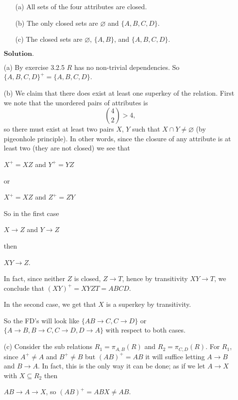 \documentclass{article}
\theoremstyle{remark}
\begin{document}
\begin{enumerate}
    \begin{itemize}
        \item[(a)] All sets of the four attributes are closed.
        \item[(b)] The only closed sets are $\varnothing$ and $\{A,B,C,D\}$.
        \item[(c)] The closed sets are $\varnothing$, $\{A,B\}$, and $\{A,B,C,D\}$. 
    \end{itemize}
    $\textbf{Solution.}$
    \item[(a)] By exercise 3.2.5 $R$ has no non-trivial dependencies. So $\{A,B,C,D\}^+ = \{A,B,C,D\}$.
    \item[(b)] We claim that there does exist at least one superkey of the relation.
    First we note that the unordered pairs of attributes is \[ \binom{4}{2} > 4,\] so there must exist at least two pairs $X$, $Y$ such that $X \cap Y \neq \varnothing$ (by pigeonhole principle).
    In other words, since the closure of any attribute is at least two (they are not closed) we see that  
    \begin{center}
        $X^+ = XZ$ and
        $Y^+ = YZ$
    \end{center}
    or
    \begin{center}
        $X^+ = XZ$ and
        $Z^+ = ZY$
    \end{center}
    So in the first case
    \begin{center}
        $X \longrightarrow Z$ and $Y \longrightarrow Z$ 
    \end{center}
    then
    \begin{center}
        $XY \longrightarrow Z$.
    \end{center}
    In fact, since neither $Z$ is closed, $Z \longrightarrow T$, hence by transitivity $XY \longrightarrow T$, we conclude 
    that $(XY)^+ = XYZT = ABCD$.

    In the second case, we get that $X$ is a superkey by transitivity.

    So the FD's will look like $\{AB \longrightarrow C, C\longrightarrow D\}$ or $\{A \longrightarrow B, B \longrightarrow C, C\longrightarrow D, D\longrightarrow A\}$ with 
    respect to both cases.

    \item[(c)] Consider the sub relations $R_1 = \pi_{A,B}(R)$ and $R_2 = \pi_{C,D}(R)$.
    For $R_1$, since $A^+ \neq A$ and $B^+ \neq B$ but $(AB)^+ = AB$ it will suffice letting $A \longrightarrow B$ and $B \longrightarrow A$.
    In fact, this is the only way it can be done; as if we let $A \longrightarrow X$ with $X \subseteq R_2$ then
    \begin{center}
        $AB \longrightarrow A \longrightarrow X$, so $(AB)^+ = ABX \neq AB$.
    \end{center}
    

\end{enumerate}
\end{document}
